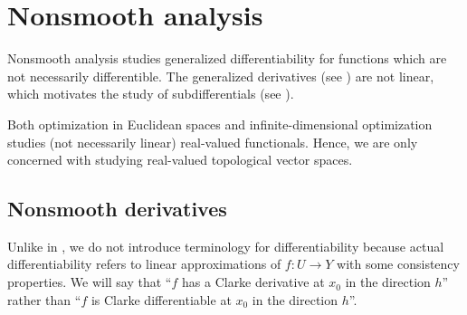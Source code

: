 \section{Nonsmooth analysis}\label{sec:nonsmooth_analysis}

\begin{remark}\label{rem:nonsmooth_analysis}
  Nonsmooth analysis studies generalized differentiability for functions which are not necessarily differentible. The generalized derivatives (see ) are not linear, which motivates the study of subdifferentials (see ).

  Both optimization in Euclidean spaces and infinite-dimensional optimization studies (not necessarily linear) real-valued functionals. Hence, we are only concerned with studying real-valued topological vector spaces.
\end{remark}

\subsection{Nonsmooth derivatives}\label{subsec:nonsmooth_derivatives}

\begin{remark}\label{rem:nonsmooth_differentiability}
  Unlike in , we do not introduce terminology for differentiability because actual differentiability refers to linear approximations of \( f: U \to Y \) with some consistency properties. We will say that \enquote{\( f \) has a Clarke derivative at \( x_0 \) in the direction \( h \)} rather than \enquote{\( f \) is Clarke differentiable at \( x_0 \) in the direction \( h \)}.
\end{remark}

